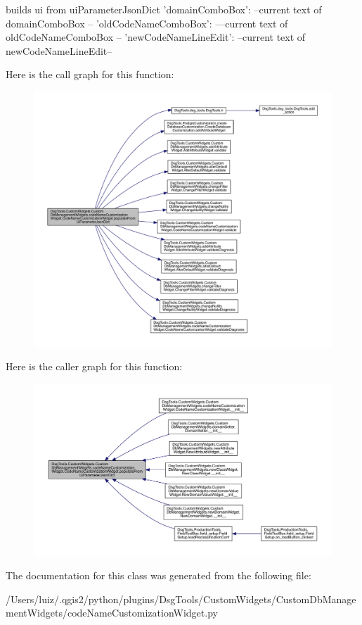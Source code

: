 \begin{DoxyVerb}builds ui from uiParameterJsonDict
{
    'domainComboBox': --current text of domainComboBox --
    'oldCodeNameComboBox': ---current text of oldCodeNameComboBox --
    'newCodeNameLineEdit': --current text of newCodeNameLineEdit--
}
\end{DoxyVerb}
 Here is the call graph for this function\+:
\nopagebreak
\begin{figure}[H]
\begin{center}
\leavevmode
\includegraphics[width=350pt]{class_dsg_tools_1_1_custom_widgets_1_1_custom_db_management_widgets_1_1code_name_customization_wf164086e8f1ece2de77d7ffd06fc1ae2_a1e1eac31ae714c40edf69ab155e17c41_cgraph}
\end{center}
\end{figure}
Here is the caller graph for this function\+:
\nopagebreak
\begin{figure}[H]
\begin{center}
\leavevmode
\includegraphics[width=350pt]{class_dsg_tools_1_1_custom_widgets_1_1_custom_db_management_widgets_1_1code_name_customization_wf164086e8f1ece2de77d7ffd06fc1ae2_a1e1eac31ae714c40edf69ab155e17c41_icgraph}
\end{center}
\end{figure}


The documentation for this class was generated from the following file\+:\begin{DoxyCompactItemize}
\item 
/\+Users/luiz/.\+qgis2/python/plugins/\+Dsg\+Tools/\+Custom\+Widgets/\+Custom\+Db\+Management\+Widgets/code\+Name\+Customization\+Widget.\+py\end{DoxyCompactItemize}
